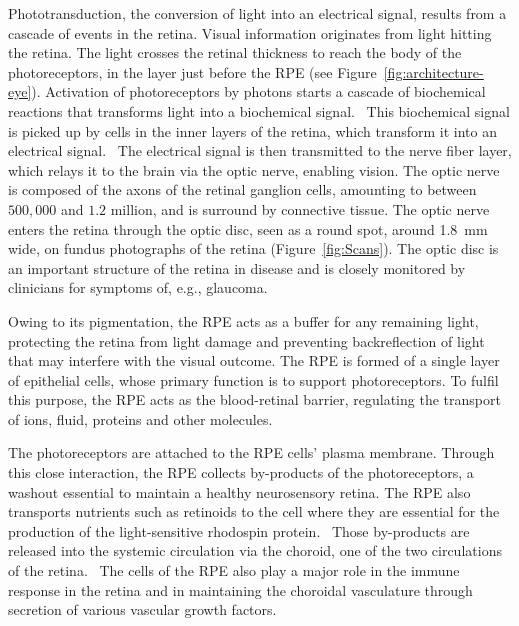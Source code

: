 \documentclass[12pt,a4paper]{journal}
\begin{document}

Phototransduction, the conversion of light into an electrical signal, results from a cascade of events in the retina. 
Visual information originates from light hitting the retina.
The light crosses the retinal thickness to reach the body of the photoreceptors, in the layer just before the RPE (see Figure~\ref{fig:architecture-eye}).
Activation of photoreceptors by photons starts a cascade of biochemical reactions that transforms light into a biochemical signal.~\cite{Hurley_2009}
This biochemical signal is picked up by cells in the inner layers of the retina, which transform it into an electrical signal.~\cite{Arslan_2018}
The electrical signal is then transmitted to the nerve fiber layer, which relays it to the brain via the optic nerve, enabling vision.
The optic nerve is composed of the axons of the retinal ganglion cells, amounting to between $500,000$ and $1.2$ million, and is surround by connective tissue\cite{Salazar_2019}.
The optic nerve enters the retina through the optic disc, seen as a round spot, around \SI{1.8}{\mm} wide, on fundus photographs of the retina (Figure~\ref{fig:Scans}).
The optic disc is an important structure of the retina in disease and is closely monitored by clinicians for symptoms of, e.g., glaucoma.

Owing to its pigmentation, the RPE acts as a buffer for any remaining light, protecting the retina from light damage and preventing backreflection of light that may interfere with the visual outcome.
The RPE is formed of a single layer of epithelial cells, whose primary function is to support photoreceptors.
To fulfil this purpose, the RPE acts as the blood-retinal barrier, regulating the transport of ions, fluid, proteins and other molecules.~\cite{Boulton_2001}

The photoreceptors are attached to the RPE cells' plasma membrane.
Through this close interaction, the RPE collects by-products of the photoreceptors, a washout essential to maintain a healthy neurosensory retina.
The RPE also transports nutrients such as retinoids to the cell where they are essential for the production of the light-sensitive rhodospin protein.~\cite{Boulton_2001} 
Those by-products are released into the systemic circulation via the choroid, one of the two circulations of the retina.~\cite{Boulton_2001}
The cells of the RPE also play a major role in the immune response in the retina and in maintaining the choroidal vasculature through secretion of various vascular growth factors.~\cite{Boulton_2001,Detrick_2020} 
\end{document}
